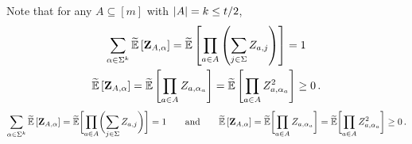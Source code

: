 
Note that for any $A \subseteq [m]$ with $\abs*{A} = k \leq t/2$,
\ifnum{}
\begin{gather*}
	\sum_{ \alpha \in \Sigma^{k}} \tildeEx{\zee_{A,\alpha}} = 
 \tildeEx{ \prod_{a\in A} \inparen{ \sum_{j\in \Sigma} Z_{a,j}} } = 1
\\
	\tildeEx{\zee_{A,\alpha}} = \tildeEx{ \prod_{a\in A} Z_{a,\alpha_a}} = \tildeEx{ \prod_{a\in
            A} Z^2_{a,\alpha_a}} \geq 0 \mper
\end{gather*}
\else
\[
	\sum_{ \alpha \in \Sigma^{k}} \tildeEx{\zee_{A,\alpha}} = 
 \tildeE\brackets[\bigg]{ \prod_{a\in A} \parens[\bigg]{\sum_{j\in \Sigma} Z_{a,j} } } = 1
\qquad \text{and} \qquad
	\tildeEx{\zee_{A,\alpha}} = \tildeE\brackets[\bigg]{ \prod_{a\in A} Z_{a,\alpha_a}} = \tildeE\brackets[\bigg]{ \prod_{a\in
            A} Z^2_{a,\alpha_a}} \geq 0 \mper
\]
\fi

